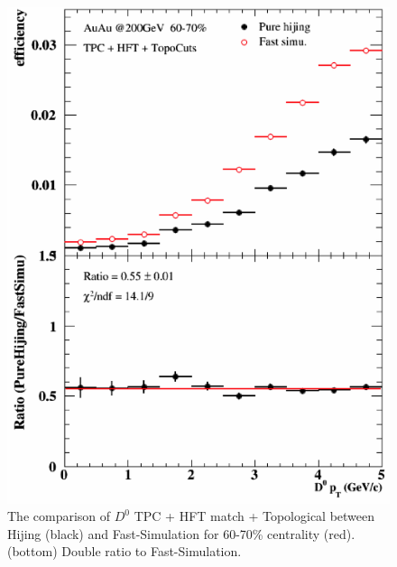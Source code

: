 \documentclass[a4paper]{article}
\begin{document}
\begin{figure}[htbp]
\begin{minipage}[htbp]{0.47\linewidth}
\end{minipage}
\hfill
\begin{minipage}[htbp]{0.47\linewidth}
\centering
\includegraphics[width=1.0\textwidth,angle=0]{fig/60_70.png} 
\caption{ The comparison of $D^0$ TPC + HFT match + Topological between Hijing (black) and Fast-Simulation for 60-70\% centrality (red). (bottom) Double ratio to Fast-Simulation.\label{60_70}}
\end{minipage}
\end{figure}
\end{document}
